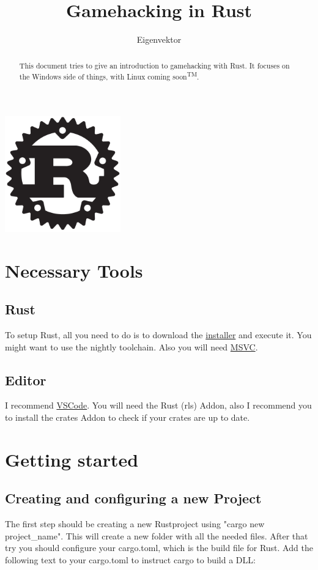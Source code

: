 \documentclass[]{scrartcl}
\title{Gamehacking in Rust}
\author{Eigenvektor}
\begin{document}
\maketitle

\begin{center}
\includegraphics[width=5cm, height=5cm]{rust.png}
\end{center}
\begin{abstract}
	\noindent
	This document tries to give an introduction to gamehacking with Rust. It focuses on the Windows side of things, with Linux coming soon\textsuperscript{TM}.
\end{abstract}

\newpage

\section{Necessary Tools}
\subsection{Rust}
\noindent
To setup Rust, all you need to do is to download the \href{https://rustup.rs/}{installer} and execute it. You might want to use the nightly toolchain. Also you will need \href{https://visualstudio.microsoft.com/thank-you-downloading-visual-studio/?sku=BuildTools&rel=15}{MSVC}.

\subsection{Editor}
I recommend \href{https://code.visualstudio.com/}{VSCode}. You will need the Rust (rls) Addon, also I recommend you to install the crates Addon to check if your crates are up to date.

\section{Getting started}
\subsection{Creating and configuring a new Project}
The first step should be creating a new Rustproject using "cargo new project\_name". This will create a new folder with all the needed files. After that try you should configure your cargo.toml, which is the build file for Rust. Add the following text to your cargo.toml to instruct cargo to build a DLL:
\end{document}
